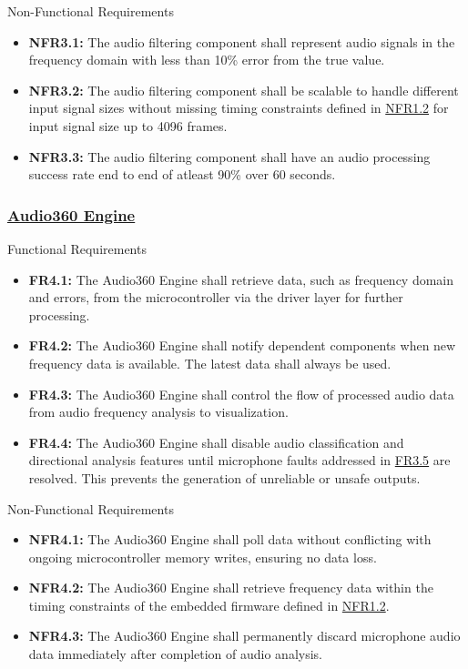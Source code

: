 \documentclass[12pt]{article}
\theoremstyle{definition}
\begin{document}
Non-Functional Requirements
\begin{itemize}
  \item \label{NFR3_1}\textbf{NFR3.1:} The audio filtering component shall 
  represent audio signals in the frequency domain with less than 10\% error from
  the true value.
  \item \label{NFR3_2}\textbf{NFR3.2:} The audio filtering component shall be
  scalable to handle different input signal sizes without missing timing
  constraints defined in \hyperref[NFR1_2]{NFR1.2} for input signal size up to
  4096 frames.

  \item \label{NFR3_3}\textbf{NFR3.3:} The audio filtering component shall have
  an audio processing success rate end to end of atleast 90\% over 60 seconds.
\end{itemize}

\subsubsection{\hyperref[comp:audio360Engine]{Audio360 Engine}} 
Functional Requirements
\begin{itemize}
  \item \label{FR4_1}\textbf{FR4.1:} The Audio360 Engine shall retrieve data,
  such as frequency domain and errors, from the microcontroller via the driver
  layer for further processing.

  \item \label{FR4_2}\textbf{FR4.2:} The Audio360 Engine shall notify dependent
  components when new frequency data is available. The latest data shall always
  be used.

  \item \label{FR4_3}\textbf{FR4.3:} The Audio360 Engine shall control the flow
  of processed audio data from audio frequency analysis to visualization.

  \item \label{FR4_4}\textbf{FR4.4:} The Audio360 Engine shall disable audio
  classification and directional analysis features until microphone faults
  addressed in \hyperref[FR3_5]{FR3.5} are resolved. This prevents the
  generation of unreliable or unsafe outputs.
\end{itemize}

Non-Functional Requirements
\begin{itemize}
  \item \label{NFR4_1}\textbf{NFR4.1:} The Audio360 Engine shall poll data
  without conflicting with ongoing microcontroller memory writes, ensuring no
  data loss.

  \item \label{NFR4_2}\textbf{NFR4.2:} The Audio360 Engine shall retrieve
  frequency data within the timing constraints of the embedded firmware defined
  in \hyperref[NFR1_2]{NFR1.2}.

  \item \label{NFR4_3}\textbf{NFR4.3:} The Audio360 Engine shall permanently
  discard microphone audio data immediately after completion of audio analysis.
\end{itemize}
\end{document}
